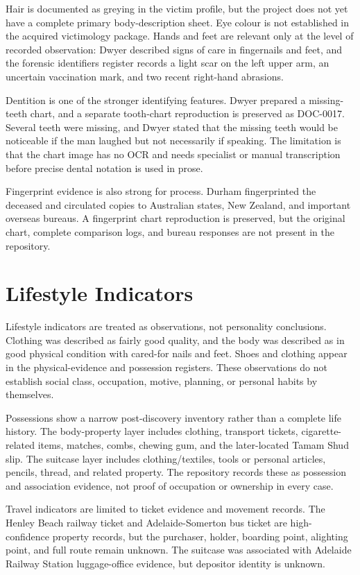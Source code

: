 Hair is documented as greying in the victim profile, but the project does not yet have a complete primary body-description sheet. Eye colour is not established in the acquired victimology package. Hands and feet are relevant only at the level of recorded observation: Dwyer described signs of care in fingernails and feet, and the forensic identifiers register records a light scar on the left upper arm, an uncertain vaccination mark, and two recent right-hand abrasions.

Dentition is one of the stronger identifying features. Dwyer prepared a missing-teeth chart, and a separate tooth-chart reproduction is preserved as DOC-0017. Several teeth were missing, and Dwyer stated that the missing teeth would be noticeable if the man laughed but not necessarily if speaking. The limitation is that the chart image has no OCR and needs specialist or manual transcription before precise dental notation is used in prose.

Fingerprint evidence is also strong for process. Durham fingerprinted the deceased and circulated copies to Australian states, New Zealand, and important overseas bureaus. A fingerprint chart reproduction is preserved, but the original chart, complete comparison logs, and bureau responses are not present in the repository.

\section{Lifestyle Indicators}

Lifestyle indicators are treated as observations, not personality conclusions. Clothing was described as fairly good quality, and the body was described as in good physical condition with cared-for nails and feet. Shoes and clothing appear in the physical-evidence and possession registers. These observations do not establish social class, occupation, motive, planning, or personal habits by themselves.

Possessions show a narrow post-discovery inventory rather than a complete life history. The body-property layer includes clothing, transport tickets, cigarette-related items, matches, combs, chewing gum, and the later-located Tamam Shud slip. The suitcase layer includes clothing/textiles, tools or personal articles, pencils, thread, and related property. The repository records these as possession and association evidence, not proof of occupation or ownership in every case.

Travel indicators are limited to ticket evidence and movement records. The Henley Beach railway ticket and Adelaide-Somerton bus ticket are high-confidence property records, but the purchaser, holder, boarding point, alighting point, and full route remain unknown. The suitcase was associated with Adelaide Railway Station luggage-office evidence, but depositor identity is unknown.

